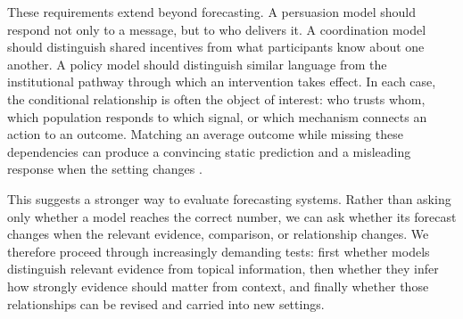 These requirements extend beyond forecasting. A persuasion model should respond
not only to a message, but to who delivers it. A coordination model should
distinguish shared incentives from what participants know about one another. A
policy model should distinguish similar language from the institutional pathway
through which an intervention takes effect. In each case, the conditional
relationship is often the object of interest: who trusts whom, which population
responds to which signal, or which mechanism connects an action to an outcome.
Matching an average outcome while missing these dependencies can produce a
convincing static prediction and a misleading response when the setting changes
\citep{park2023generative,aher2023simulate,argyle2023out,bisbee2024synthetic}.

This suggests a stronger way to evaluate forecasting systems. Rather than asking
only whether a model reaches the correct number, we can ask whether its forecast
changes when the relevant evidence, comparison, or relationship changes. We
therefore proceed through increasingly demanding tests: first whether models
distinguish relevant evidence from topical information, then whether they infer
how strongly evidence should matter from context, and finally whether those
relationships can be revised and carried into new settings.
